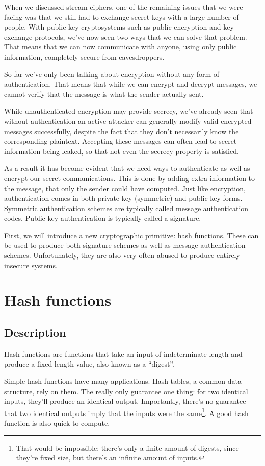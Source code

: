\documentclass[11pt,ebook,table,dvipsnames]{memoir}
\begin{document}
When we discussed stream ciphers, one of the remaining issues that we
were facing was that we still had to exchange secret keys with a large
number of people. With public-key cryptosystems such as public
encryption and key exchange protocols, we've now seen two ways that we
can solve that problem. That means that we can now communicate with
anyone, using only public information, completely secure from
eavesdroppers.

So far we've only been talking about encryption without any form of
authentication. That means that while we can encrypt and decrypt
messages, we cannot verify that the message is what the sender
actually sent.

While unauthenticated encryption may provide secrecy, we've already
seen that without authentication an active attacker can generally
modify valid encrypted messages successfully, despite the fact that
they don't necessarily know the corresponding plaintext. Accepting
these messages can often lead to secret information being leaked, so
that not even the secrecy property is satisfied.

As a result it has become evident that we need ways to authenticate as
well as encrypt our secret communications. This is done by adding
extra information to the message, that only the sender could have
computed. Just like encryption, authentication comes in both
private-key (symmetric) and public-key forms. Symmetric authentication
schemes are typically called message authentication codes. Public-key
authentication is typically called a signature.

First, we will introduce a new cryptographic primitive: hash
functions. These can be used to produce both signature schemes as well
as message authentication schemes. Unfortunately, they are also very
often abused to produce entirely insecure systems.
\chapter{Hash functions}
\label{sec-2-6}
\section{Description}
\label{sec-2-6-1}

Hash functions are functions that take an input of indeterminate
length and produce a fixed-length value, also known as a \enquote{digest}.

Simple hash functions have many applications. Hash tables, a common
data structure, rely on them. The really only guarantee one thing: for
two identical inputs, they'll produce an identical output.
Importantly, there's no guarantee that two identical outputs imply
that the inputs were the same\footnote{That would be impossible: there's
only a finite amount of digests, since they're fixed size, but there's
an infinite amount of inputs.}. A good hash function is also quick to
compute.
\end{document}
